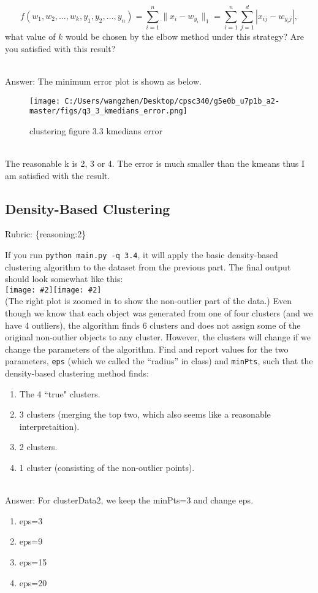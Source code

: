 \documentclass{article}
\def\blu#1{{\color{blu}#1}}
\def\gre#1{{\color{gre}#1}}
\def\norm#1{\|#1\|}
\newcommand{\fig}[2]{\texttt{[image: \#2]}}
\def\enum#1{\begin{enumerate}#1\end{enumerate}}
\def\rubric#1{\gre{Rubric: \{#1\}}}{}
\begin{document}
{{\[
f(w_1,w_2,\dots,w_k,y_1,y_2,\dots,y_n) = \sum_{i=1}^n \norm{x_i - w_{y_i}}_1 = \sum_{i=1}^n \sum_{j=1}^d |x_{ij} - w_{y_ij}|,
\]
what value of $k$ would be chosen by the elbow method under this strategy? Are you satisfied with this result?
\textcolor{gre}{\\Answer: The minimum error plot is shown as below.\\
 \begin{figure}[h!]
\texttt{[image: C:/Users/wangzhen/Desktop/cpsc340/g5e0b\_u7p1b\_a2-master/figs/q3\_3\_kmedians\_error.png]}
\caption{clustering figure 3.3 kmedians error}
\end{figure}
\\The reasonable k is 2, 3 or 4. The error is much smaller than the kmeans thus I am satisfied with the result.}
}
}

\subsection{Density-Based Clustering}
\rubric{reasoning:2}

If you run \texttt{python main.py -q 3.4},
it will apply the basic density-based clustering algorithm to the dataset from the previous part.
The final output should look somewhat like this:\\
\fig{.49}{../figs/density}\fig{.49}{../figs/density2}\\
(The right plot is zoomed in to show the non-outlier part of the data.)
Even though we know that each object was generated from one of four clusters (and we have 4 outliers),
 the algorithm finds 6 clusters and does not assign some of the original non-outlier
  objects to any cluster. However, the clusters will change if we change the parameters
  of the algorithm. Find and report values for the two
  parameters, \texttt{eps} (which we called the ``radius'' in class) and \texttt{minPts},
   such that the density-based clustering method finds:
\blu{\enum{
\item The 4 ``true" clusters.
\item 3 clusters (merging the top two, which also seems like a reasonable interpretaition).
\item 2 clusters.
\item 1 cluster (consisting of the non-outlier points).
}
}
\textcolor{gre}{\\Answer: For clusterData2, we keep the minPts=3 and change eps.
\enum{
\item eps=3
\item eps=9
\item eps=15
\item eps=20
}}
\end{document}
